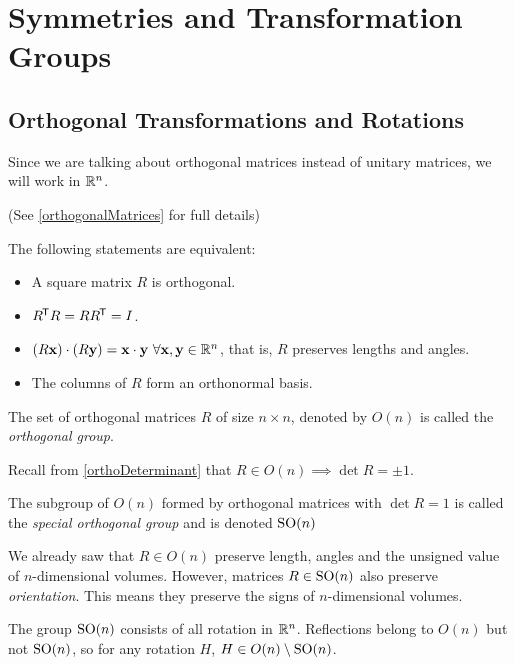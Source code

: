 \documentclass[../main.tex]{subfiles}
\begin{document}
\section{Symmetries and Transformation Groups}
\subsection{Orthogonal Transformations and Rotations}
Since we are talking about orthogonal matrices instead of unitary matrices, we will work in $\mathbb{R}^{n}$.
\begin{remark}[Recap] (See \cref{orthogonalMatrices} for full details)

  The following statements are equivalent:
  \begin{itemize}
    \item A square matrix $R$ is orthogonal.
    \item $R^{{\mkern-1.5mu\mathsf{T}}} R = R R^{{\mkern-1.5mu\mathsf{T}}} = I$.
    \item $(R \mathbf{\bm{x}})\cdot(R \mathbf{\bm{y}}) = \mathbf{\bm{x}} \cdot \mathbf{\bm{y}}\ \forall \mathbf{\bm{x}}, \mathbf{\bm{y}} \in \mathbb{R}^{n}$, that is, $R$ preserves lengths and angles.
    \item The columns of $R$ form an orthonormal basis.
  \end{itemize}
\end{remark}
\begin{definition}
  The set of orthogonal matrices $R$ of size $n \times n$, denoted by $O(n)$ is called the \textit{orthogonal group}.
\end{definition}
Recall from \cref{orthoDeterminant} that $R \in O(n) \implies \det R = \pm 1$.
\begin{definition}
  The subgroup of $O(n)$ formed by orthogonal matrices with $\det R = 1$ is called the \textit{special orthogonal group} and is denoted $\mathrm{SO}(n)$
\end{definition}
We already saw that $R \in O(n)$ preserve length, angles and the unsigned value of $n$-dimensional volumes.
However, matrices $R \in \mathrm{SO}(n)$ also preserve \textit{orientation}.
This means they preserve the signs of $n$-dimensional volumes.

The group $\mathrm{SO}(n)$ consists of all rotation in $\mathbb{R}^{n}$.
Reflections belong to $O(n)$ but not $\mathrm{SO}(n)$, so for any rotation $H$, $H \in O(n) \setminus \mathrm{SO}(n)$.
\end{document}

